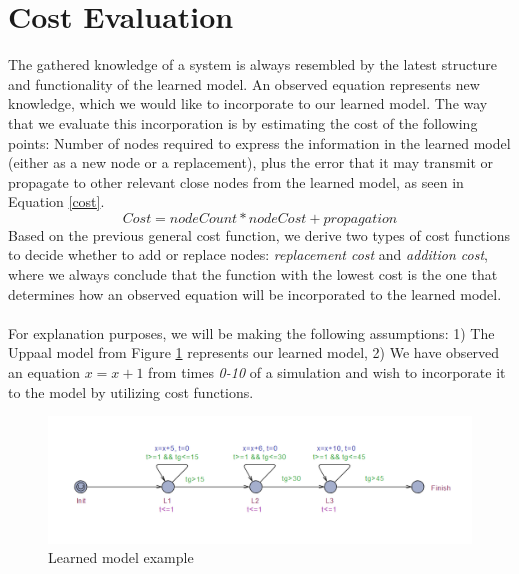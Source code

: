 \section{Cost Evaluation}
%
The gathered knowledge of a system is always resembled by the latest structure and functionality of the learned model. An observed equation represents new knowledge, which we would like to incorporate to our learned model. The way that we evaluate this incorporation is by estimating the cost of the following points: Number of nodes required to express the information in the learned model (either as a new node or a replacement), plus the error that it may transmit or propagate to other relevant close nodes from the learned model, as seen in Equation \ref{cost}.
\begin{equation} 
\label{cost}
	Cost = nodeCount*nodeCost + propagation
\end{equation}
%
Based on the previous general cost function, we derive two types of cost functions to decide whether to add or replace nodes: \textit{replacement cost} and \textit{addition cost}, where we always conclude that the function with the lowest cost is the one that determines how an observed equation will be incorporated to the learned model. \\ \\
%
For explanation purposes, we will be making the following assumptions: 1) The Uppaal model from Figure \ref{learned_model_example} represents our learned model, 2) We have observed an equation $x=x+1$ from times \textit{0-10} of a simulation and wish to incorporate it to the model by utilizing cost functions. 
%
\begin{figure}[h]
	\centering
	\includegraphics[scale=0.5]{./pictures/learned_model_example.png}
	\caption{Learned model example}
	\label{learned_model_example}
\end{figure}


